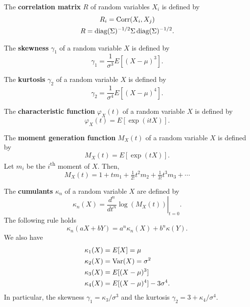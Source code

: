\documentclass[10pt]{article}
\begin{document}
\begin{outline}
\1 The \textbf{correlation matrix} $R$ of random variables $X_i$ is defined by
\begin{gather*}
  R_{i}= \operatorname{Corr}(X_i,X_j)\\
  R = \operatorname{diag}(\Sigma)^{-1/2}\Sigma\operatorname{diag}(\Sigma)^{-1/2}.
\end{gather*}

\1 The \textbf{skewness} $\gamma_1$ of a random variable $X$ is defined by
\begin{equation*}
  \gamma_1 = \frac{1}{\sigma^3}E[(X-\mu)^3].
\end{equation*}

\1 The \textbf{kurtosis} $\gamma_2$ of a random variable $X$ is defined by
\begin{equation*}
  \gamma_2 = \frac{1}{\sigma^4}E[(X-\mu)^4].
\end{equation*}

\1 The \textbf{characteristic function} $\varphi_X(t)$ of a random variable $X$ is defined by
\begin{equation*}
  \varphi_X(t) = E[\exp(itX)].
\end{equation*}

\1 The \textbf{moment generation function} $M_X(t)$ of a random variable $X$ is defined by
\begin{equation*}
  M_X(t) = E[\exp(tX)].
\end{equation*}
Let $m_i$ be the $i$\textsuperscript{th} moment of $X$. Then,
\begin{equation*}
  M_X(t) = 1+tm_1 + \tfrac{1}{2!}t^2m_2 + \tfrac{1}{3!} t^3m_3 + \cdots
\end{equation*}

\1 The \textbf{cumulants} $\kappa_n$ of a random variable $X$ are defined by
\begin{equation*}
  \kappa_n(X) = \left.\frac{d^n}{dt^n}\log(M_X(t))\right\vert_{t=0}.
\end{equation*}
The following rule holds
\begin{equation*}
  \kappa_n(aX + bY) = a^n\kappa_n(X) + b^n\kappa(Y).
\end{equation*}
We also have
\begin{align*}
  \kappa_1(X) &= E[X]=\mu\\
  \kappa_2(X) &= \operatorname{Var}(X) = \sigma^2\\
  \kappa_3(X) &= E[(X-\mu)^3]\\
  \kappa_4(X) &= E[(X-\mu)^4] - 3\sigma^4.
\end{align*}
In particular, the skewness $\gamma_1 = \kappa_3/\sigma^3$ and the kurtosis $\gamma_2 =
3+\kappa_4/\sigma^4$. 
\end{outline}
\end{document}

